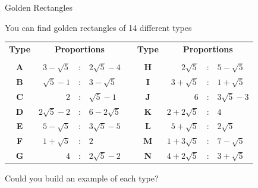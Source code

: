\documentclass[14pt]{beamer}
\begin{document}

    \begin{frame}{Golden Rectangles}
        \begin{center}
            You can find golden rectangles of 14 different types

            \bigskip\bigskip

            {\small\begin{tabular}{c|rclcc|rcl}
                \textbf{Type} & \multicolumn{3}{c}{\textbf{Proportions}} & \qquad & \textbf{Type} & \multicolumn{3}{c}{\textbf{Proportions}} \\[0.5ex]\cline{1-4}\cline{6-9}&&&&&&&&\\[-1.5ex]
                \textbf{A} & $3\!-\!\sqrt{5}$  &\!\!\!\!:\!\!\!\!& $2\sqrt{5}\!-\!4$ & & \textbf{H} & $2\sqrt{5}$       &\!\!\!\!:\!\!\!\!& $5\!-\!\sqrt{5}$  \\
                \textbf{B} & $\sqrt{5}\!-\!1$  &\!\!\!\!:\!\!\!\!& $3\!-\!\sqrt{5}$  & & \textbf{I} & $3\!+\!\sqrt{5}$  &\!\!\!\!:\!\!\!\!& $1\!+\!\sqrt{5}$  \\
                \textbf{C} & $2$               &\!\!\!\!:\!\!\!\!& $\sqrt{5}\!-\!1$  & & \textbf{J} & $6$               &\!\!\!\!:\!\!\!\!& $3\sqrt{5}\!-\!3$ \\
                \textbf{D} & $2\sqrt{5}\!-\!2$ &\!\!\!\!:\!\!\!\!& $6\!-\!2\sqrt{5}$ & & \textbf{K} & $2\!+\!2\sqrt{5}$ &\!\!\!\!:\!\!\!\!& $4$               \\
                \textbf{E} & $5\!-\!\sqrt{5}$  &\!\!\!\!:\!\!\!\!& $3\sqrt{5}\!-\!5$ & & \textbf{L} & $5\!+\!\sqrt{5}$  &\!\!\!\!:\!\!\!\!& $2\sqrt{5}$       \\
                \textbf{F} & $1\!+\!\sqrt{5}$  &\!\!\!\!:\!\!\!\!& $2$               & & \textbf{M} & $1\!+\!3\sqrt{5}$ &\!\!\!\!:\!\!\!\!& $7\!-\!\sqrt{5}$  \\
                \textbf{G} & $4$               &\!\!\!\!:\!\!\!\!& $2\sqrt{5}\!-\!2$ & & \textbf{N} & $4\!+\!2\sqrt{5}$ &\!\!\!\!:\!\!\!\!& $3\!+\!\sqrt{5}$  \\
            \end{tabular}}

            \bigskip\bigskip

            Could you build an example of each type?
        \end{center}
    \end{frame}

\end{document}
